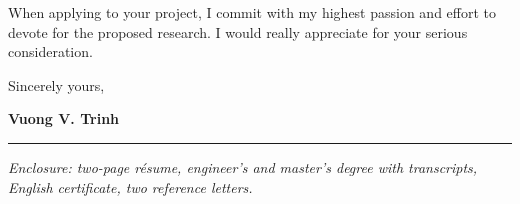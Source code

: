 \documentclass[a4paper,11pt]{article}
\begin{document}
{\begin{minipage}[t]{\textwidth+\marginparwidth+\marginparsep}
\vspace{0.3cm}

When applying to your project, I commit with my highest passion and effort to devote for the proposed research. I would really appreciate for your serious consideration. 

\vspace{0.3cm}

Sincerely yours,

\vspace{0.3cm}

\textbf{Vuong V. Trinh}

\vspace{3.5cm}

\rule{\columnwidth}{1pt}

\emph{Enclosure: two-page r\'esume, engineer's and master's degree with transcripts, English certificate, two reference letters.}

\end{minipage}}
\end{document}
